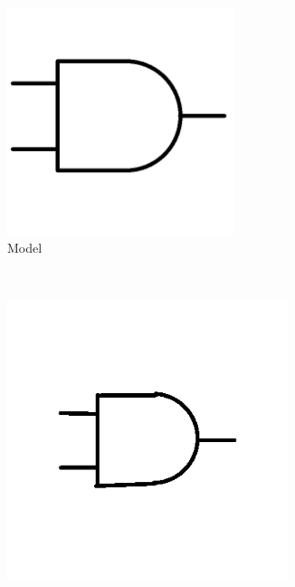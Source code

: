     \begin{figure}[h]
        \centering
                \begin{subfigure}[b]{0.2\textwidth}
                \centering
                \includegraphics[width=0.73\textwidth]{figures/Results/Sketches25/Model.png}
                \caption{Model}
        \end{subfigure}\\
                \begin{subfigure}[b]{0.25\textwidth}
                \centering
                \includegraphics[width=0.9\textwidth]{figures/Results/Sketches25/level1.png}

\end{subfigure}
\end{figure}
